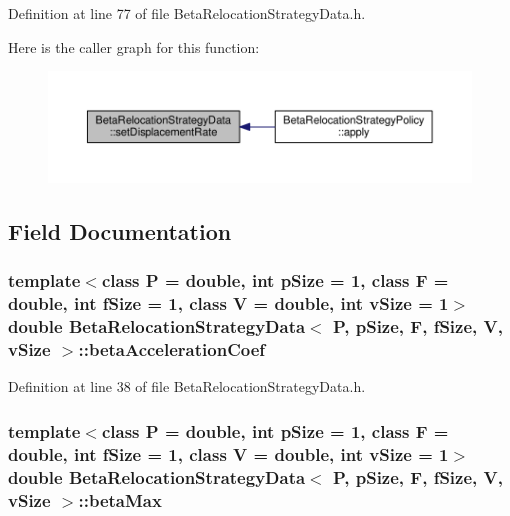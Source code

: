 Definition at line 77 of file Beta\+Relocation\+Strategy\+Data.\+h.



Here is the caller graph for this function\+:\nopagebreak
\begin{figure}[H]
\begin{center}
\leavevmode
\includegraphics[width=350pt]{structBetaRelocationStrategyData_a542d95263cbcd95c32b43f31881331a5_icgraph}
\end{center}
\end{figure}




\subsection{Field Documentation}
\subsubsection[{\texorpdfstring{beta\+Acceleration\+Coef}{betaAccelerationCoef}}]{\setlength{\rightskip}{0pt plus 5cm}template$<$class P = double, int p\+Size = 1, class F = double, int f\+Size = 1, class V = double, int v\+Size = 1$>$ double {\bf Beta\+Relocation\+Strategy\+Data}$<$ P, p\+Size, F, f\+Size, V, v\+Size $>$\+::beta\+Acceleration\+Coef}\hypertarget{structBetaRelocationStrategyData_a957ba3439a50f2dadf2e500ac0cfcd3c}{}\label{structBetaRelocationStrategyData_a957ba3439a50f2dadf2e500ac0cfcd3c}


Definition at line 38 of file Beta\+Relocation\+Strategy\+Data.\+h.

\subsubsection[{\texorpdfstring{beta\+Max}{betaMax}}]{\setlength{\rightskip}{0pt plus 5cm}template$<$class P = double, int p\+Size = 1, class F = double, int f\+Size = 1, class V = double, int v\+Size = 1$>$ double {\bf Beta\+Relocation\+Strategy\+Data}$<$ P, p\+Size, F, f\+Size, V, v\+Size $>$\+::beta\+Max}\hypertarget{structBetaRelocationStrategyData_acfd06a41587b792b0f85807fe800b46a}{}\label{structBetaRelocationStrategyData_acfd06a41587b792b0f85807fe800b46a}


